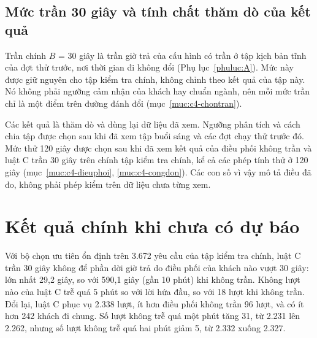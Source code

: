
\subsection{Mức trần 30 giây và tính chất thăm dò của kết quả}
\label{muc:c4-thamdo}

Trần chính $B$ = 30 giây là trần giờ trả của cấu hình có trần ở tập kịch bản tĩnh của đợt thử trước, nơi thời gian đi
không đổi (Phụ lục~\ref{phuluc:A}). Mức này được giữ nguyên cho tập kiểm tra chính, không chỉnh theo kết quả của tập
này. Nó không phải ngưỡng cảm nhận của khách hay chuẩn ngành, nên mỗi mức trần chỉ là một điểm trên đường đánh đổi
(mục~\ref{muc:c4-chontran}).

Các kết quả là thăm dò và dùng lại dữ liệu đã xem. Ngưỡng phân tích và cách chia tập được chọn sau khi đã xem tập buổi
sáng và các đợt chạy thử trước đó. Mức thử 120 giây được chọn sau khi đã xem kết quả của điều phối không trần và luật
C trần 30 giây trên chính tập kiểm tra chính, kể cả các phép tính thử ở 120 giây (mục~\ref{muc:c4-dieuphoi},
\ref{muc:c4-congdon}). Các con số vì vậy mô tả điều đã đo, không phải phép kiểm trên dữ liệu chưa từng xem.

\section{Kết quả chính khi chưa có dự báo}
\label{muc:c4-ketqua}

Với bộ chọn ưu tiên ổn định trên 3.672 yêu cầu của tập kiểm tra chính, luật C trần 30 giây không để phần dời giờ trả do điều phối của khách
nào vượt 30 giây: lớn nhất 29,2 giây, so với 590,1 giây (gần 10 phút) khi không trần. Không lượt nào của luật C trễ
quá 5 phút so với lời hứa đầu, so với 18 lượt khi không trần. Đổi lại, luật C phục vụ 2.338 lượt, ít hơn điều phối
không trần 96 lượt, và có ít hơn 242 khách đi chung. Số lượt không trễ quá một phút tăng 31, từ 2.231 lên 2.262, nhưng
số lượt không trễ quá hai phút giảm 5, từ 2.332 xuống 2.327.

